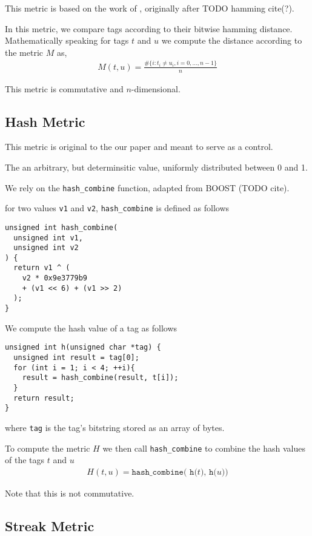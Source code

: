 This metric is based on the work of \citep{lalejini2019else}, originally after TODO hamming cite(?).

In this metric, we compare tags according to their bitwise hamming distance.
Mathematically speaking for tags $t$ and $u$ we compute the distance according to the metric $M$ as,
\begin{align*}
M(t, u)
= \frac{
  \#\{ i : t_i \neq u_i, i=0, \dots ,n-1\}
}{
  n
}
\end{align*}

This metric is commutative and $n$-dimensional.

\subsection{Hash Metric}

This metric is original to the our paper and meant to serve as a control.

The an arbitrary, but determinsitic value, uniformly distributed between 0 and 1.

We rely on the \texttt{hash\_combine} function, adapted from BOOST (TODO cite).

for two values \texttt{v1} and \texttt{v2}, \texttt{hash\_combine} is defined as follows
\begin{verbatim}
unsigned int hash_combine(
  unsigned int v1,
  unsigned int v2
) {
  return v1 ^ (
    v2 * 0x9e3779b9
    + (v1 << 6) + (v1 >> 2)
  );
}
\end{verbatim}

We compute the hash value of a tag as follows
\begin{verbatim}
unsigned int h(unsigned char *tag) {
  unsigned int result = tag[0];
  for (int i = 1; i < 4; ++i){
    result = hash_combine(result, t[i]);
  }
  return result;
}
\end{verbatim}
where \texttt{tag} is the tag's bitstring stored as an array of bytes.

To compute the metric $H$ we then call \texttt{hash\_combine} to combine the hash values of the tags $t$ and $u$
\begin{align*}
H(t, u) = \texttt{hash\_combine( h(}t\texttt{), h(}u\texttt{))}
\end{align*}

Note that this is not commutative.

\subsection{Streak Metric}

